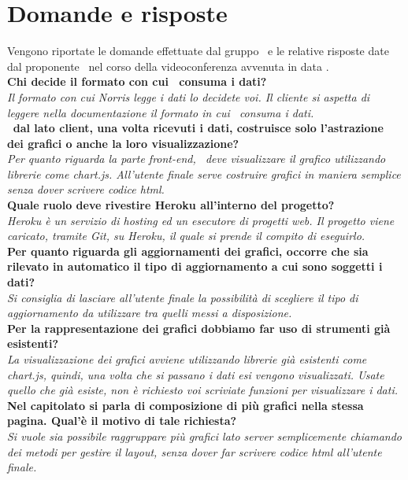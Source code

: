 \section{Domande e risposte}
	Vengono riportate le domande effettuate dal gruppo \groupname\ e le relative risposte date dal proponente \proponente\, nel corso della videoconferenza avvenuta in data .\\
	
	\textbf{Chi decide il formato con cui \projectname\ consuma i dati?}\\
	\textit{Il formato con cui Norris legge i dati lo decidete voi. Il cliente si aspetta di leggere nella documentazione il formato in cui \projectname\ consuma i dati.}\\
	
	\textbf{\projectname\, dal lato client, una volta ricevuti i dati, costruisce solo l'astrazione dei grafici o anche la loro visualizzazione?}\\
	\textit{Per quanto riguarda la parte front-end, \projectname\ deve visualizzare il grafico utilizzando librerie come chart.js. All'utente finale serve costruire grafici in maniera semplice senza dover scrivere codice html.}\\
	
	\textbf{Quale ruolo deve rivestire Heroku all'interno del progetto?}\\
	\textit{Heroku è un servizio di hosting ed un esecutore di progetti web. Il progetto viene caricato, tramite Git, su Heroku, il quale si prende il compito di eseguirlo.}\\
	
	\textbf{Per quanto riguarda gli aggiornamenti dei grafici, occorre che sia rilevato in automatico il tipo di aggiornamento a cui sono soggetti i dati?}\\
	\textit{Si consiglia di lasciare all'utente finale la possibilità di scegliere il tipo di aggiornamento da utilizzare tra quelli messi a disposizione.}\\
	
	\textbf{Per la rappresentazione dei grafici dobbiamo far uso di strumenti già esistenti?}\\
	\textit{La visualizzazione dei grafici avviene utilizzando librerie già esistenti come chart.js, quindi, una volta che si passano i dati esi vengono visualizzati. Usate quello che già esiste, non è richiesto voi scriviate funzioni per visualizzare i dati.}\\
	
	\textbf{Nel capitolato si parla di composizione di più grafici nella stessa pagina. Qual'è il motivo di tale richiesta?}\\
	\textit{Si vuole sia possibile raggruppare più grafici lato server semplicemente chiamando dei metodi per gestire il layout, senza dover far scrivere codice html all'utente finale.}\\
	
